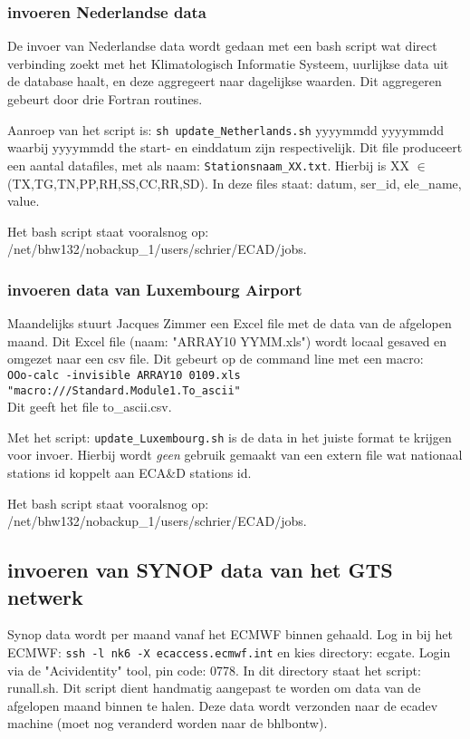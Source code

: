 \documentclass{article}
\begin{document}
\subsubsection*{invoeren Nederlandse data}
De invoer van Nederlandse data wordt gedaan met een bash script wat direct verbinding zoekt met het Klimatologisch 
Informatie Systeem,
uurlijkse data uit de database haalt, en deze aggregeert naar dagelijkse waarden. Dit aggregeren gebeurt door drie Fortran routines.

Aanroep van het script is:
\texttt{sh update\_Netherlands.sh} yyyymmdd yyyymmdd\\
waarbij yyyymmdd the start- en einddatum zijn respectivelijk. Dit file produceert een aantal datafiles, met als naam: 
\texttt{Stationsnaam\_XX.txt}. Hierbij is XX $\in$ (TX,TG,TN,PP,RH,SS,CC,RR,SD). In deze files staat: datum, ser\_id, ele\_name, 
value. 

Het bash script staat vooralsnog op: /net/bhw132/nobackup\_1/users/schrier/ECAD/jobs.

\subsubsection*{invoeren data van Luxembourg Airport}
Maandelijks stuurt Jacques Zimmer een Excel file met de data van de afgelopen maand. Dit Excel file (naam: "ARRAY10 YYMM.xls") 
wordt locaal gesaved en omgezet naar een csv file. Dit gebeurt op de command line met een macro:\\
\texttt{OOo-calc -invisible ARRAY10\ 0109.xls "macro:///Standard.Module1.To\_ascii"}\\
Dit geeft het file to\_ascii.csv.

Met het script: \texttt{update\_Luxembourg.sh} is de data in het juiste format te krijgen voor invoer. Hierbij wordt \emph{geen}
gebruik gemaakt van een extern file wat nationaal stations id koppelt aan ECA\&D stations id.

Het bash script staat vooralsnog op: /net/bhw132/nobackup\_1/users/schrier/ECAD/jobs.

\subsection*{invoeren van SYNOP data van het GTS netwerk}
Synop data wordt per maand vanaf het ECMWF binnen gehaald. Log in bij het ECMWF: \texttt{ssh -l nk6 -X ecaccess.ecmwf.int} en kies
directory: ecgate. Login via de "Acividentity" tool, pin code: 0778. 
In dit directory staat het script: runall.sh. Dit script dient handmatig aangepast te worden om data van de afgelopen maand binnen 
te halen. Deze data wordt verzonden naar de ecadev machine (moet nog veranderd worden naar de bhlbontw).
\end{document}
